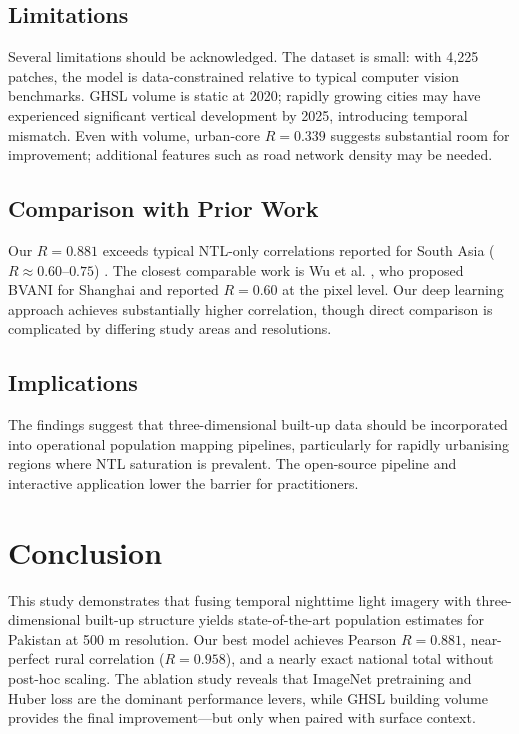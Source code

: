 \documentclass[conference]{IEEEtran}
\begin{document}
\subsection{Limitations}
\label{subsec:limitations}

Several limitations should be acknowledged. The dataset is small: with 4,225 patches, the model is data-constrained relative to typical computer vision benchmarks. GHSL volume is static at 2020; rapidly growing cities may have experienced significant vertical development by 2025, introducing temporal mismatch. Even with volume, urban-core $R = 0.339$ suggests substantial room for improvement; additional features such as road network density may be needed.

\subsection{Comparison with Prior Work}
\label{subsec:prior}

Our $R = 0.881$ exceeds typical NTL-only correlations reported for South Asia ($R \approx 0.60$--$0.75$) \cite{hall1995forest, tatem2014population}. The closest comparable work is Wu et al. \cite{wu2023bvani}, who proposed BVANI for Shanghai and reported $R = 0.60$ at the pixel level. Our deep learning approach achieves substantially higher correlation, though direct comparison is complicated by differing study areas and resolutions.

\subsection{Implications}
\label{subsec:implications}

The findings suggest that three-dimensional built-up data should be incorporated into operational population mapping pipelines, particularly for rapidly urbanising regions where NTL saturation is prevalent. The open-source pipeline and interactive application lower the barrier for practitioners.

\section{Conclusion}
\label{sec:conclusion}

This study demonstrates that fusing temporal nighttime light imagery with three-dimensional built-up structure yields state-of-the-art population estimates for Pakistan at 500 m resolution. Our best model achieves Pearson $R = 0.881$, near-perfect rural correlation ($R = 0.958$), and a nearly exact national total without post-hoc scaling. The ablation study reveals that ImageNet pretraining and Huber loss are the dominant performance levers, while GHSL building volume provides the final improvement---but only when paired with surface context.
\end{document}
